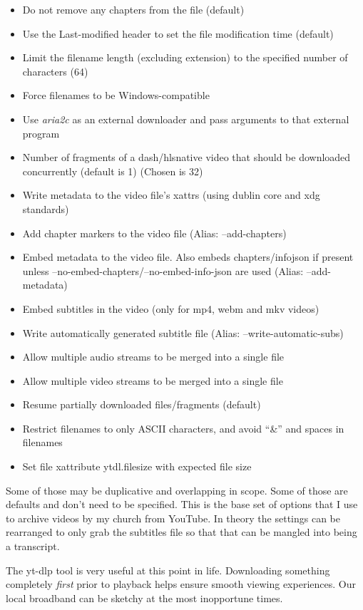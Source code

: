 \begin{itemize}
\tightlist
\item
  Do not remove any chapters from the file (default)
\item
  Use the Last-modified header to set the file modification time
  (default)
\item
  Limit the filename length (excluding extension) to the specified
  number of characters (64)
\item
  Force filenames to be Windows-compatible
\item
  Use \emph{aria2c} as an external downloader and pass arguments to that
  external program
\item
  Number of fragments of a dash/hlsnative video that should be
  downloaded concurrently (default is 1) (Chosen is 32)
\item
  Write metadata to the video file's xattrs (using dublin core and xdg
  standards)
\item
  Add chapter markers to the video file (Alias: --add-chapters)
\item
  Embed metadata to the video file. Also embeds chapters/infojson if
  present unless --no-embed-chapters/--no-embed-info-json are used
  (Alias: --add-metadata)
\item
  Embed subtitles in the video (only for mp4, webm and mkv videos)
\item
  Write automatically generated subtitle file (Alias:
  --write-automatic-subs)
\item
  Allow multiple audio streams to be merged into a single file
\item
  Allow multiple video streams to be merged into a single file
\item
  Resume partially downloaded files/fragments (default)
\item
  Restrict filenames to only ASCII characters, and avoid ``\&'' and
  spaces in filenames
\item
  Set file xattribute ytdl.filesize with expected file size
\end{itemize}

Some of those may be duplicative and overlapping in scope. Some of those
are defaults and don't need to be specified. This is the base set of
options that I use to archive videos by my church from YouTube. In
theory the settings can be rearranged to only grab the subtitles file so
that that can be mangled into being a transcript.

The yt-dlp tool is very useful at this point in life. Downloading
something completely \emph{first} prior to playback helps ensure smooth
viewing experiences. Our local broadband can be sketchy at the most
inopportune times.

